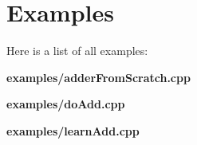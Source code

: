\section{Examples}
Here is a list of all examples:\begin{CompactItemize}
\item 
{\bf examples/adderFromScratch.cpp}
\item 
{\bf examples/doAdd.cpp}
\item 
{\bf examples/learnAdd.cpp}
\end{CompactItemize}
